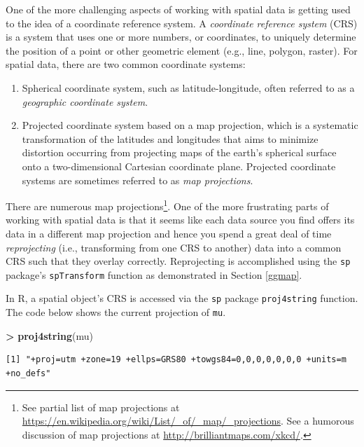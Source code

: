 \documentclass[]{krantz}
\makeatletter
\newenvironment{Shaded}{\begin{snugshade}}{\end{snugshade}}
\newcommand{\KeywordTok}[1]{\textcolor[rgb]{0.27,0.27,0.27}{\textbf{#1}}}
\newcommand{\NormalTok}[1]{#1}
\newcommand{\OperatorTok}[1]{\textcolor[rgb]{0.43,0.43,0.43}{\textbf{#1}}}
\newcommand{\StringTok}[1]{\textcolor[rgb]{0.5,0.5,0.5}{#1}}
\providecommand{\tightlist}{%
  \setlength{\itemsep}{0pt}\setlength{\parskip}{0pt}}
\newenvironment{kframe}{%
\medskip{}
\setlength{\fboxsep}{.8em}
 \def\at@end@of@kframe{}%
 \ifinner\ifhmode%
  \def\at@end@of@kframe{\end{minipage}}%
  \begin{minipage}{\columnwidth}%
 \fi\fi%
 \def\FrameCommand##1{\hskip\@totalleftmargin \hskip-\fboxsep
 \colorbox{shadecolor}{##1}\hskip-\fboxsep
     \hskip-\linewidth \hskip-\@totalleftmargin \hskip\columnwidth}%
 \MakeFramed {\advance\hsize-\width
   \@totalleftmargin\z@ \linewidth\hsize
   \@setminipage}}%
 {\par\unskip\endMakeFramed%
 \at@end@of@kframe}
\renewenvironment{Shaded}{\begin{kframe}}{\end{kframe}}
\makeatother
\begin{document}
One of the more challenging aspects of working with spatial data is getting used to the idea of a coordinate reference system. A \emph{coordinate reference system} (CRS) is a system that uses one or more numbers, or coordinates, to uniquely determine the position of a point or other geometric element (e.g., line, polygon, raster). For spatial data, there are two common coordinate systems:

\begin{enumerate}
\def\labelenumi{\arabic{enumi}.}
\tightlist
\item
  Spherical coordinate system, such as latitude-longitude, often referred to as a \emph{geographic coordinate system}.
\item
  Projected coordinate system based on a map projection, which is a systematic transformation of the latitudes and longitudes that aims to minimize distortion occurring from projecting maps of the earth's spherical surface onto a two-dimensional Cartesian coordinate plane. Projected coordinate systems are sometimes referred to as \emph{map projections}.
\end{enumerate}

There are numerous map projections\footnote{See partial list of map projections at \url{https://en.wikipedia.org/wiki/List/_of/_map/_projections}. See a humorous discussion of map projections at \url{http://brilliantmaps.com/xkcd/}.}. One of the more frustrating parts of working with spatial data is that it seems like each data source you find offers its data in a different map projection and hence you spend a great deal of time \emph{reprojecting} (i.e., transforming from one CRS to another) data into a common CRS such that they overlay correctly. Reprojecting is accomplished using the \texttt{sp} package's \texttt{spTransform} function as demonstrated in Section \ref{ggmap}.

In R, a spatial object's CRS is accessed via the \texttt{sp} package \texttt{proj4string} function. The code below shows the current projection of \texttt{mu}.

\begin{Shaded}
\begin{Highlighting}[]
\OperatorTok{>}\StringTok{ }\KeywordTok{proj4string}\NormalTok{(mu)}
\end{Highlighting}
\end{Shaded}

\begin{verbatim}
[1] "+proj=utm +zone=19 +ellps=GRS80 +towgs84=0,0,0,0,0,0,0 +units=m +no_defs"
\end{verbatim}
\end{document}
